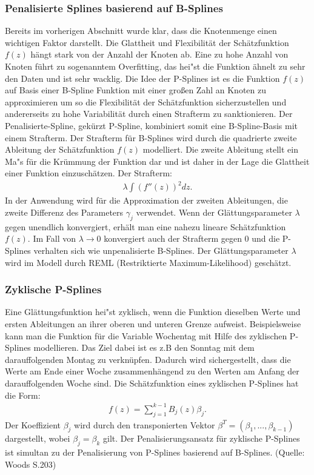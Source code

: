 \subsubsection{Penalisierte Splines basierend auf B-Splines}
Bereits im vorherigen Abschnitt wurde klar, dass die Knotenmenge einen wichtigen Faktor darstellt. Die Glattheit und Flexibilität der Schätzfunktion $f(z)$ hängt stark von der Anzahl der Knoten ab. Eine zu hohe Anzahl von Knoten führt zu sogenanntem \glqq Overfitting\grqq, das hei"st die Funktion ähnelt zu sehr den Daten und ist sehr wacklig. Die Idee der P-Splines ist es die Funktion $f(z)$ auf Basis einer B-Spline Funktion mit einer großen Zahl an Knoten zu approximieren um so die Flexibilität der Schätzfunktion sicherzustellen und andererseits zu hohe Variabilität durch einen Strafterm zu sanktionieren. Der Penalisierte-Spline, gekürzt P-Spline, kombiniert somit eine B-Spline-Basis mit einem Strafterm. Der Strafterm für B-Splines wird durch die quadrierte zweite Ableitung der Schätzfunktion $f(z)$ modelliert. Die zweite Ableitung stellt ein Ma"s für die Krümmung der Funktion dar und ist daher in der Lage die Glattheit einer Funktion einzuschätzen.
Der Strafterm: 
\begin{align}
\lambda\int(f''(z))^2dz.
\end{align}
In der Anwendung wird für die Approximation der zweiten Ableitungen, die zweite Differenz des Parameters $\gamma_{j}$ verwendet. Wenn der Glättungsparameter $\lambda$ gegen unendlich konvergiert, erhält man eine nahezu lineare Schätzfunktion $f(z)$. Im Fall von $\lambda \to 0$ konvergiert auch der Strafterm gegen $0$ und die P-Splines verhalten sich wie unpenalisierte B-Splines. Der Glättungsparameter $\lambda$ wird im Modell durch REML (Restriktierte Maximum-Likelihood) geschätzt.

\subsubsection{Zyklische P-Splines}
Eine Glättungsfunktion hei"st zyklisch, wenn die Funktion dieselben Werte und ersten Ableitungen an ihrer oberen und unteren Grenze aufweist. Beispielsweise kann man die Funktion für die Variable Wochentag mit Hilfe des zyklischen P-Splines modellieren. Das Ziel dabei ist es z.B den Sonntag mit dem darauffolgenden Montag zu verknüpfen. Dadurch wird sichergestellt, dass die Werte am Ende einer Woche zusammenhängend zu den Werten am Anfang der darauffolgenden Woche sind. 
Die Schätzfunktion eines zyklischen P-Splines hat die Form:
\begin{align}
f(z)=\sum_{j=1}^{k-1}B_{j}(z)\beta_{j}.
\end{align}
Der Koeffizient $\beta_{j}$ wird durch den transponierten Vektor $\beta^T=(\beta_{1},...,\beta_{k-1})$ dargestellt, wobei $\beta_{j}=\beta_{k}$ gilt.
Der Penalisierungsansatz für zyklische P-Splines ist simultan zu der Penalisierung von P-Splines basierend auf B-Splines. (Quelle: Woods S.203)


